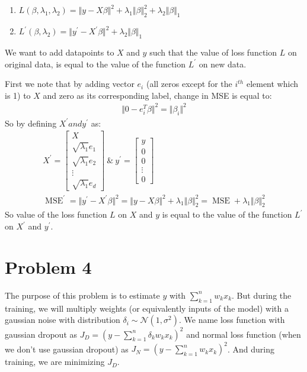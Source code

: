 \documentclass[]{article}
\numberwithin{equation}{section}
\newcommand{\norm}[2][]{\Vert #2\Vert_{#1}}
\newcommand{\transpose}{^T}
\DeclareMathOperator*{\MSE}{MSE}
\begin{document}
\subsection{}
\begin{enumerate}
    \item \(L(\beta, \lambda_1, \lambda_2) = \norm{y - X\beta}^2 + \lambda_1 \norm[2]{\beta}^2 + \lambda_2 \norm[1]{\beta}\) 
    \item \(L^\prime(\beta, \lambda_2) = \norm{y^\prime - X^\prime \beta}^2 + \lambda_2 \norm[1]{\beta}\) 
\end{enumerate}
We want to add datapoints to \(X\) and \(y\) such that the value of loss function \(L\) on original data, is equal to the value of the function \(L^\prime\) on new data.

First we note that by adding vector \(e_i\) (all zeros except for the \(i^{th}\) element which is 1) to \(X\) and zero as its corresponding label, change in MSE is equal to:
\begin{gather}
    \norm{0 - e_i\transpose \beta}^2 = \norm{\beta_i}^2
\end{gather}
So by defining \(X^\prime and y^\prime\) as:
\begin{gather}
X^\prime = \begin{bmatrix} X \\ \sqrt{\lambda_1}e_1 \\ \sqrt{\lambda_1}e_2 \\ \vdots \\ \sqrt{\lambda_1}e_d \end{bmatrix} 
\ \& \ y^\prime = \begin{bmatrix} y \\ 0 \\ 0 \\ \vdots \\ 0 \end{bmatrix}\\
{\MSE}^\prime = \norm{y^\prime - X^\prime \beta}^2 = \norm{y - X\beta}^2 + \lambda_1 \norm[2]{\beta}^2 = \MSE + \lambda_1 \norm[2]{\beta}^2
\end{gather}
So value of the loss function \(L\) on \(X\) and \(y\) is equal to the value of the function \(L^\prime\) on \(X^\prime\) and \(y^\prime\).

\section{Problem 4}
The purpose of this problem is to estimate \(y\) with \(\sum_{k=1}^n w_k x_k\).
But during the training, we will multiply weights (or equivalently inputs of the model) with a gaussian noise with distribution \(\delta_i \sim \mathcal{N}(1, \sigma^2)\).
We name loss function with gaussian dropout as \(J_D = (y - \sum_{k=1}^n \delta_k w_k x_k)^2\) and normal loss function (when we don't use gaussian dropout) as \(J_N = (y - \sum_{k=1}^n w_k x_k)^2\).
And during training, we are minimizing \(J_D\).
\end{document}
